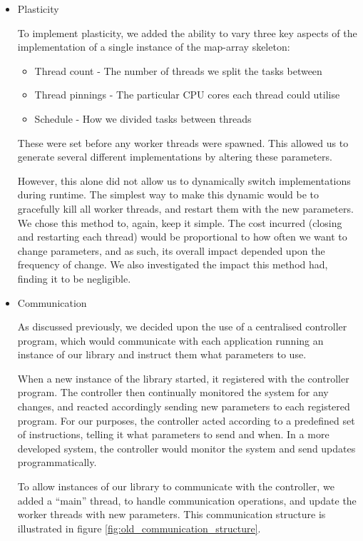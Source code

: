 \begin{itemize}
    \item Plasticity
    
        To implement plasticity, we added the ability to vary three key aspects of the implementation of a single instance of the map-array skeleton:
    
        \begin{itemize}
        	\item Thread count - The number of threads we split the tasks between
        	\item Thread pinnings - The particular CPU cores each thread could utilise
        	\item Schedule - How we divided tasks between threads
        \end{itemize}
        
        These were set before any worker threads were spawned. This allowed us to generate several different implementations by altering these parameters.
        
        However, this alone did not allow us to dynamically switch implementations during runtime. The simplest way to make this dynamic would be to gracefully kill all worker threads, and restart them with the new parameters. We chose this method to, again, keep it simple. The cost incurred (closing and restarting each thread) would be proportional to how often we want to change parameters, and as such, its overall impact depended upon the frequency of change. We also investigated the impact this method had, finding it to be negligible.
    
    \item Communication
    
        As discussed previously, we decided upon the use of a centralised controller program, which would communicate with each application running an instance of our library and instruct them what parameters to use.
        
        When a new instance of the library started, it registered with the controller program. The controller then continually monitored the system for any changes, and reacted accordingly sending new parameters to each registered program. For our purposes, the controller acted according to a predefined set of instructions, telling it what parameters to send and when. In a more developed system, the controller would monitor the system and send updates programmatically.
        
        To allow instances of our library to communicate with the controller, we added a ``main'' thread, to handle communication operations, and update the worker threads with new parameters. This communication structure is illustrated in figure \ref{fig:old_communication_structure}.
        

\end{itemize}

